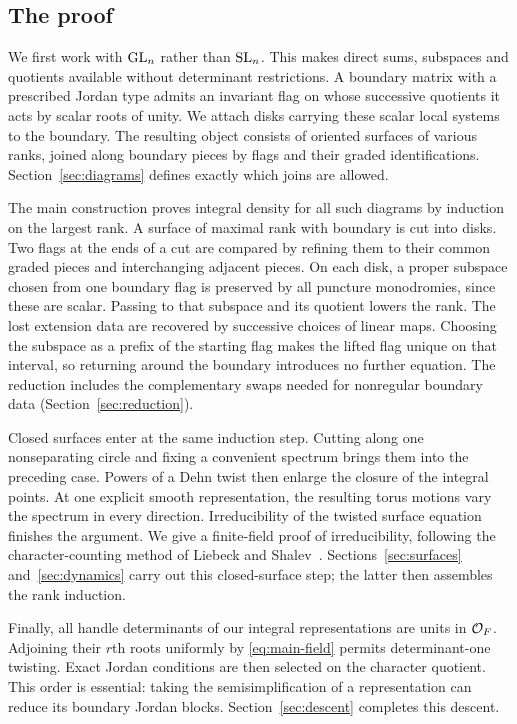 \subsection{The proof}

We first work with $\operatorname{GL}_n$ rather than $\operatorname{SL}_n$. This makes direct sums,
subspaces and quotients available without determinant restrictions.
A boundary matrix with a prescribed Jordan type admits an invariant
flag on whose successive quotients it acts by scalar roots of unity.
We attach disks carrying these scalar local systems to the boundary.
The resulting object consists of oriented surfaces of various ranks,
joined along boundary pieces by flags and their graded identifications.
Section~\ref{sec:diagrams} defines exactly which joins are allowed.

The main construction proves integral density for all such diagrams by
induction on the largest rank. A surface of maximal rank with boundary
is cut into disks. Two flags at the ends of a cut are compared by
refining them to their common graded pieces and interchanging adjacent
pieces. On each disk, a proper subspace chosen from one boundary flag
is preserved by all puncture monodromies, since these are scalar. Passing
to that subspace and its quotient lowers the rank. The lost extension
data are recovered by successive choices of linear maps. Choosing the
subspace as a prefix of the starting flag makes the lifted flag unique
on that interval, so returning around the boundary introduces no further
equation.
The reduction includes the complementary swaps needed for
nonregular boundary data (Section~\ref{sec:reduction}).

Closed surfaces enter at the same induction step. Cutting along one
nonseparating circle and fixing a convenient spectrum brings them into
the preceding case. Powers of a Dehn twist then enlarge the closure of
the integral points. At one explicit smooth representation, the
resulting torus motions vary the spectrum in every direction.
Irreducibility of the twisted surface equation finishes the argument.
We give a finite-field proof of irreducibility, following the
character-counting method of Liebeck and Shalev~\cite{LiebeckShalev2005}.
Sections~\ref{sec:surfaces} and~\ref{sec:dynamics} carry out this
closed-surface step; the latter then assembles the rank induction.

Finally, all handle determinants of our integral representations are
units in $\mathcal O_F$. Adjoining their $r$th roots uniformly by
\eqref{eq:main-field} permits determinant-one twisting. Exact Jordan
conditions are then selected on the character quotient. This order is
essential: taking the semisimplification of a representation can reduce
its boundary Jordan blocks. Section~\ref{sec:descent} completes this descent.

